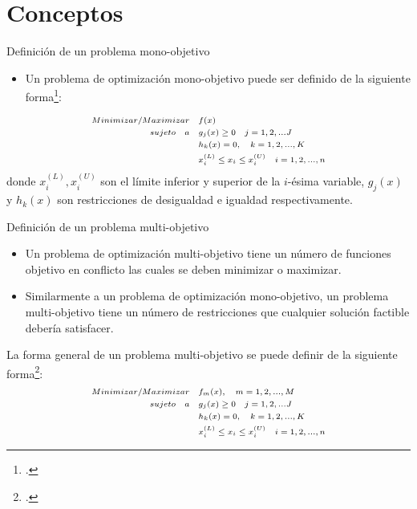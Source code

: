\documentclass{beamer}
\begin{document}
\section{Conceptos}

\begin{frame}{Definición de un problema mono-objetivo}
    \begin{itemize}
\justifying
\item Un problema de optimización mono-objetivo puede ser definido de la siguiente forma\footcite{nocedal2006numerical}:
%
\end{itemize}
\begin{equation}
\scriptsize
\begin{split}
Minimizar/Maximizar \quad &f(x)  \\
sujeto\quad a \quad  &g_j(x) \geq 0 \quad j = 1,2, ... J\\
&h_k(x) = 0, \quad k=1,2, ..., K\\
&x_i^{(L)} \leq x_i \leq x_i^{(U)} \quad i = 1,2, ..., n 
\end{split}
\label{eqn:MOOP}
\end{equation}
donde $x_i^{(L)}, x_i^{(U)}$ son el límite inferior y superior de la $i$-ésima variable, $g_j(x)$ y $h_k(x)$ son restricciones de desigualdad e igualdad respectivamente.
%
\end{frame}



\begin{frame}{Definición de un problema multi-objetivo}
\begin{itemize}
    \item Un problema de optimización multi-objetivo tiene un número de funciones objetivo en conflicto las cuales se deben minimizar o maximizar.
    \item Similarmente a un problema de optimización mono-objetivo, un problema multi-objetivo tiene un número de restricciones que cualquier solución factible debería satisfacer.
\end{itemize}

La forma general de un problema multi-objetivo se puede definir de la siguiente forma\footcite{Joel:Kalyanmoy}:
\begin{equation}
\scriptsize
\begin{split}
Minimizar/Maximizar \quad &f_m(x), \quad m=1,2,...,M  \\
sujeto\quad a \quad  &g_j(x) \geq 0 \quad j = 1,2, ... J\\
&h_k(x) = 0, \quad k=1,2, ..., K\\
&x_i^{(L)} \leq x_i \leq x_i^{(U)} \quad i = 1,2, ..., n 
\end{split}
\label{eqn:MOOP}
\end{equation}
\end{frame}
\end{document}
